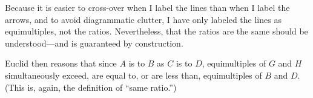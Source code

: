 \documentclass[11pt]{article}
\newcommand{\flushleftright}{\noindent\justifying}
\begin{document}

\flushleftright%
Because it is easier to cross-over when I label the lines than when I label the arrows, and to avoid diagrammatic clutter, I have only labeled the lines as equimultiples, not the ratios. Nevertheless, that the ratios are the same should be understood---and is guaranteed by construction.

Euclid then reasons that since $A$ is to $B$ as $C$ is to $D$, equimultiples of $G$ and $H$ simultaneously exceed, are equal to, or are less than, equimultiples of $B$ and $D$. (This is, again, the definition of ``same ratio.'')
\end{document}
